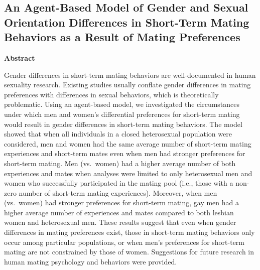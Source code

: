 \documentclass[
  12pt,
]{article}
\author{}
\date{\vspace{-2.5em}}
\begin{document}
\begin{titlepage}

\begin{center}

\vspace*{30mm}

\hypertarget{an-agent-based-model-of-gender-and-sexual-orientation-differences-in-short-term-mating-behaviors-as-a-result-of-mating-preferences}{%
\section*{An Agent-Based Model of Gender and Sexual Orientation
Differences in Short-Term Mating Behaviors as a Result of Mating
Preferences}\label{an-agent-based-model-of-gender-and-sexual-orientation-differences-in-short-term-mating-behaviors-as-a-result-of-mating-preferences}}

\end{center}

\end{titlepage}

\newpage

\textbf{Abstract}

Gender differences in short-term mating behaviors are well-documented in
human sexuality research. Existing studies usually conflate gender
differences in mating preferences with differences in sexual behaviors,
which is theoretically problematic. Using an agent-based model, we
investigated the circumstances under which men and women's differential
preferences for short-term mating would result in gender differences in
short-term mating behaviors. The model showed that when all individuals
in a closed heterosexual population were considered, men and women had
the same average number of short-term mating experiences and short-term
mates even when men had stronger preferences for short-term mating. Men
(vs.~women) had a higher average number of both experiences and mates
when analyses were limited to only heterosexual men and women who
successfully participated in the mating pool (i.e., those with a
non-zero number of short-term mating experiences). Moreover, when men
(vs.~women) had stronger preferences for short-term mating, gay men had
a higher average number of experiences and mates compared to both
lesbian women and heterosexual men. These results suggest that even when
gender differences in mating preferences exist, those in short-term
mating behaviors only occur among particular populations, or when men's
preferences for short-term mating are not constrained by those of women.
Suggestions for future research in human mating psychology and behaviors
were provided.
\end{document}
